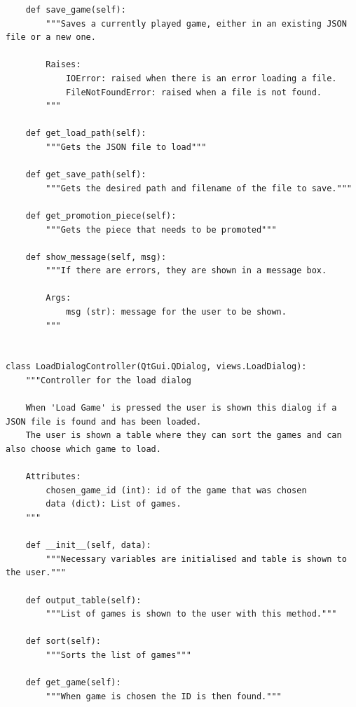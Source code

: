\begin{verbatim}
 	def save_game(self):
		"""Saves a currently played game, either in an existing JSON file or a new one.
	
		Raises:
			IOError: raised when there is an error loading a file.
			FileNotFoundError: raised when a file is not found.
		"""
		
	def get_load_path(self):
		"""Gets the JSON file to load"""
		
	def get_save_path(self):
		"""Gets the desired path and filename of the file to save."""
	
 	def get_promotion_piece(self):
		"""Gets the piece that needs to be promoted"""
	
 	def show_message(self, msg):
		"""If there are errors, they are shown in a message box.
	
		Args:
			msg (str): message for the user to be shown.
		"""
		

class LoadDialogController(QtGui.QDialog, views.LoadDialog):
	"""Controller for the load dialog

	When 'Load Game' is pressed the user is shown this dialog if a JSON file is found and has been loaded.
	The user is shown a table where they can sort the games and can also choose which game to load.

	Attributes:
		chosen_game_id (int): id of the game that was chosen
		data (dict): List of games.
	"""
	
 	def __init__(self, data):
		"""Necessary variables are initialised and table is shown to the user."""
	
 	def output_table(self):
		"""List of games is shown to the user with this method."""
	
 	def sort(self):
		"""Sorts the list of games"""
	
 	def get_game(self):
		"""When game is chosen the ID is then found."""
\end{verbatim}
